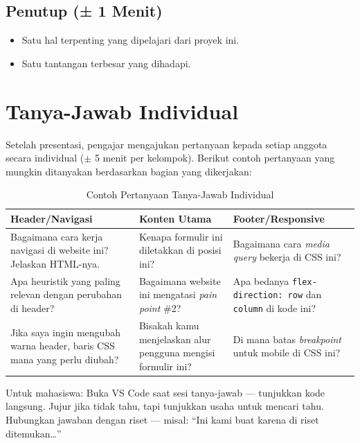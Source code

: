 \subsection{Penutup (± 1 Menit)}
\label{subsec:penutup-presentasi}

\begin{itemize}
  \item Satu hal terpenting yang dipelajari dari proyek ini.
  \item Satu tantangan terbesar yang dihadapi.
\end{itemize}

\section{Tanya-Jawab Individual}
\label{sec:tanya-jawab}

Setelah presentasi, pengajar mengajukan pertanyaan kepada setiap anggota secara individual ($\pm$ 5 menit per kelompok). Berikut contoh pertanyaan yang mungkin ditanyakan berdasarkan bagian yang dikerjakan:

\begin{table}[htbp]
\centering
\caption{Contoh Pertanyaan Tanya-Jawab Individual}
\label{tab:pertanyaan-tj}
\small
\begin{tabular}{@{}p{5cm}p{5cm}p{5cm}@{}}
\toprule
\textbf{Header/Navigasi} & \textbf{Konten Utama} & \textbf{Footer/Responsive} \\
\midrule
Bagaimana cara kerja navigasi di website ini? Jelaskan HTML-nya. & Kenapa formulir ini diletakkan di posisi ini? & Bagaimana cara \emph{media query} bekerja di CSS ini? \\
Apa heuristik yang paling relevan dengan perubahan di header? & Bagaimana website ini mengatasi \emph{pain point} \#2? & Apa bedanya \texttt{flex-direction: row} dan \texttt{column} di kode ini? \\
Jika saya ingin mengubah warna header, baris CSS mana yang perlu diubah? & Bisakah kamu menjelaskan alur pengguna mengisi formulir ini? & Di mana batas \emph{breakpoint} untuk mobile di CSS ini? \\
\bottomrule
\end{tabular}
\end{table}

\begin{tip}
Untuk mahasiswa: Buka VS Code saat sesi tanya-jawab --- tunjukkan kode langsung. Jujur jika tidak tahu, tapi tunjukkan usaha untuk mencari tahu. Hubungkan jawaban dengan riset --- misal: ``Ini kami buat karena di riset ditemukan\ldots''
\end{tip}

